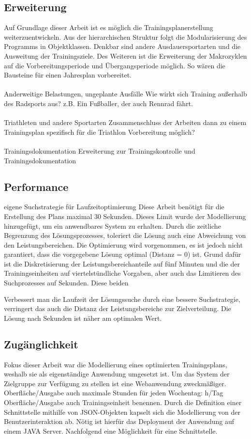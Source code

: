 \subsection{Erweiterung} 
Auf Grundlage dieser Arbeit ist es möglich die Trainingsplanerstellung weiterzuentwickeln. 
Aus der hierarchischen Struktur folgt die Modularisierung des Programms in Objektklassen.
Denkbar sind andere Ausdauersportarten und die Ausweitung der Trainingsziele. 
Des Weiteren ist die Erweiterung der Makrozyklen auf die Vorbereitungsperiode und Übergangsperiode möglich. So wären die Bausteine für einen Jahresplan vorbereitet. \\ \\
Anderweitige Belastungen, ungeplante Ausfälle
Wie wirkt sich Training außerhalb des Radsports aus? z.B. Ein Fußballer, der auch Rennrad fährt. \\ \\
Triathleten und andere Sportarten
Zusammenschluss der Arbeiten dann zu einem Trainingsplan spezifisch für die Triathlon Vorbereitung möglich? \\ \\
Trainingsdokumentation
Erweiterung zur Trainingskontrolle und Trainingsdokumentation

\subsection{Performance}
eigene Suchstrategie für Laufzeitoptimierung
Diese Arbeit benötigt für die Erstellung des Plans maximal 30 Sekunden. Dieses Limit wurde der Modellierung hinzugefügt, um ein anwendbares System zu erhalten. Durch die zeitliche Begrenzung des Lösungsprozesses, toleriert die Lösung auch eine Abweichung von den Leistungsbereichen. Die Optimierung wird vorgenommen, es ist jedoch nicht garantiert, dass die vorgegebene Lösung optimal (Distanz = 0) ist. Grund dafür ist die Diskretisierung der Leistungsbereichanteile auf fünf Minuten und die der Trainingseinheiten auf viertelstündliche Vorgaben, aber auch das Limitieren des Suchprozesses auf  Sekunden. Diese beiden 

Verbessert man die Laufzeit der Lösungssuche durch eine bessere Suchstrategie, verringert das auch die Distanz der Leistungsbereiche zur Zielverteilung. Die Lösung nach  Sekunden ist näher am optimalen Wert.

\subsection{Zugänglichkeit}
Fokus dieser Arbeit war die Modellierung eines optimierten Trainingsplans, weshalb sie als eigenständige Anwendung umgesetzt ist. Um das System der Zielgruppe zur Verfügung zu stellen ist eine Webanwendung zweckmäßiger. 
Oberfläche/Ausgabe auch maximale Stunden für jeden Wochentag: h/Tag
Oberfläche/Ausgabe auch Trainingseinheit benennen.
Durch die Definition einer Schnittstelle mithilfe von JSON-Objekten kapselt sich die Modellierung von der Benutzerinteraktion ab. Nötig ist hierfür das Deployment der Anwendung auf einem JAVA Server. Nachfolgend eine Möglichkeit für eine Schnittstelle.

